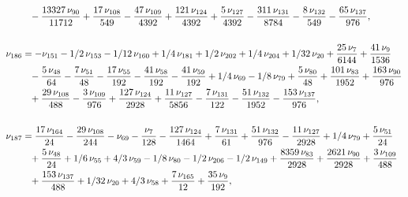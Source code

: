 \documentclass[a4paper,12pt, DIV=14, BCOR=5mm, twoside, headsepline]{scrbook}
\begin{document}
\begin{align}
\begin{aligned}
 &\hphantom{=}-{\frac {13327\,\nu_{{90
}}}{11712}}+{\frac {17\,\nu_{{108}}}{549}}-{\frac {47\,\nu_{{109}}}{
4392}}+{\frac {121\,\nu_{{124}}}{4392}}+{\frac {5\,\nu_{{127}}}{4392}}
-{\frac {311\,\nu_{{131}}}{8784}}-{\frac {8\,\nu_{{132}}}{549}}-{
\frac {65\,\nu_{{137}}}{976}}, \\
\\
\nu_{{186}}&=-\nu_{{151}}-1/2\,\nu_{{153}
}-1/12\,\nu_{{160}}+1/4\,\nu_{{181}}+1/2\,\nu_{{202}}+1/4\,\nu_{{204}}
+1/32\,\nu_{{20}}+{\frac {25\,\nu_{{7}}}{6144}}+{\frac {41\,\nu_{{9}}
}{1536}}\\
 &\hphantom{=}-{\frac {5\,\nu_{{48}}}{64}}-{\frac {7\,\nu_{{51}}}{48}}-{
\frac {17\,\nu_{{55}}}{192}}-{\frac {41\,\nu_{{58}}}{192}}-{\frac {41
\,\nu_{{59}}}{192}}+1/4\,\nu_{{69}}-1/8\,\nu_{{79}}+{\frac {5\,\nu_{{
80}}}{48}}+{\frac {101\,\nu_{{83}}}{1952}}+{\frac {163\,\nu_{{90}}}{
976}}\\
 &\hphantom{=}+{\frac {29\,\nu_{{108}}}{488}}-{\frac {3\,\nu_{{109}}}{976}}+{
\frac {127\,\nu_{{124}}}{2928}}+{\frac {11\,\nu_{{127}}}{5856}}-{
\frac {7\,\nu_{{131}}}{122}}-{\frac {51\,\nu_{{132}}}{1952}}-{\frac {
153\,\nu_{{137}}}{976}}, \\
\\
\nu_{{187}}&={\frac {17\,\nu_{{164}}}{24}}-{
\frac {29\,\nu_{{108}}}{244}}-\nu_{{69}}-{\frac {\nu_{{7}}}{128}}-{
\frac {127\,\nu_{{124}}}{1464}}+{\frac {7\,\nu_{{131}}}{61}}+{\frac {
51\,\nu_{{132}}}{976}}-{\frac {11\,\nu_{{127}}}{2928}}+1/4\,\nu_{{79}}
+{\frac {5\,\nu_{{51}}}{24}}\\
 &\hphantom{=}+{\frac {5\,\nu_{{48}}}{24}}+1/6\,\nu_{{55
}}+4/3\,\nu_{{59}}-1/8\,\nu_{{80}}-1/2\,\nu_{{206}}-1/2\,\nu_{{149}}+{
\frac {8359\,\nu_{{83}}}{2928}}+{\frac {2621\,\nu_{{90}}}{2928}}+{
\frac {3\,\nu_{{109}}}{488}}\\
 &\hphantom{=}+{\frac {153\,\nu_{{137}}}{488}}+1/32\,\nu
_{{20}}+4/3\,\nu_{{58}}+{\frac {7\,\nu_{{165}}}{12}}+{\frac {35\,\nu_{
{9}}}{192}}, 
\end{aligned}
\end{align}
\end{document}
